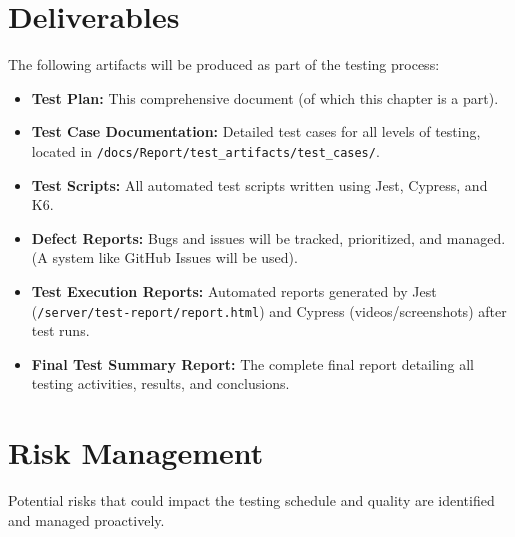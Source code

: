\section{Deliverables}
The following artifacts will be produced as part of the testing process:
\begin{itemize}
    \item \textbf{Test Plan:} This comprehensive document (of which this chapter is a part).
    \item \textbf{Test Case Documentation:} Detailed test cases for all levels of testing, located in \texttt{/docs/Report/test\_artifacts/test\_cases/}.
    \item \textbf{Test Scripts:} All automated test scripts written using Jest, Cypress, and K6.
    \item \textbf{Defect Reports:} Bugs and issues will be tracked, prioritized, and managed. (A system like GitHub Issues will be used).
    \item \textbf{Test Execution Reports:} Automated reports generated by Jest (\texttt{/server/test-report/report.html}) and Cypress (videos/screenshots) after test runs.
    \item \textbf{Final Test Summary Report:} The complete final report detailing all testing activities, results, and conclusions.
\end{itemize}

\section{Risk Management}
Potential risks that could impact the testing schedule and quality are identified and managed proactively.

